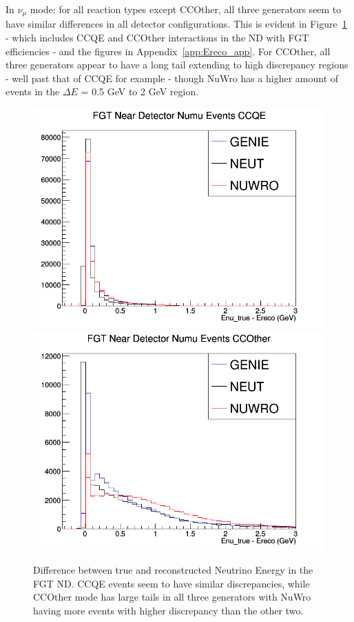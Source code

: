 \documentclass[12pt]{article}
\begin{document}
In $\nu_\mu$ mode: for all reaction types except CCOther, all three generators seem to have similar differences in all detector configurations. This is evident in Figure~\ref{fig:numu_Etrue_ereco_FGT_CCQE_and_CCOther} - which includes CCQE and CCOther interactions in the ND with FGT efficiencies - and the figures in Appendix~\ref{app:Ereco_app}. For CCOther, all three generators appear to have a long tail extending to high discrepancy regions - well past that of CCQE for example - though NuWro has a higher amount of events in the $\Delta E$ = 0.5 GeV to 2 GeV region. 
\begin{figure}[h]
\centering
{}
\includegraphics[width=\linewidth]{Ereco_Etrue/numu_FGT_CCQE.png}
\endminipage
{}
\includegraphics[width=\linewidth]{Ereco_Etrue/numu_FGT_CCOther.png}
\endminipage
\caption{Difference between true and reconstructed Neutrino Energy in the FGT ND. CCQE events seem to have similar discrepancies, while CCOther mode has large tails in all three generators with NuWro having more events with higher discrepancy than the other two. }
\label{fig:numu_Etrue_ereco_FGT_CCQE_and_CCOther}
\end{figure}
\FloatBarrier
\end{document}
